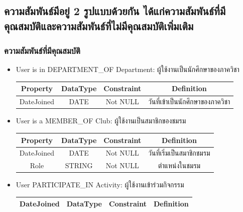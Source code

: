 \documentclass[14pt,oneside,openright,a4paper]{cpe-thai-project}
\begin{document}
    \subsection{ความสัมพันธ์มีอยู่ 2 รูปแบบด้วยกัน ได้แก่ความสัมพันธ์ที่มีคุณสมบัติและความสัมพันธ์ที่ไม่มีคุณสมบัติเพิ่มเติม}

    \subsubsection{ความสัมพันธ์ที่มีคุณสมบัติ}
    \begin{itemize}
      \normalsize
      \item User is in DEPARTMENT\_OF Department: ผู้ใช้งานเป็นนักศึกษาของภาควิชา
        \begin{center}
          \begin{tabular}{|c|c|c|c|}
          \hline
          \rowcolor[HTML]{9FC5E8} 
          Property   & DataType & Constraint & Definition \\ \hline
          DateJoined & DATE     & Not NULL    & วันที่เข้าเป็นนักศึกษาของภาควิชา \\ \hline
          \end{tabular}
          \label{tab:DepartmentRelationship}
        \end{center}
      \item User is a MEMBER\_OF Club: ผู้ใช้งานเป็นสมาชิกของชมรม
        \begin{center}
          \begin{tabular}{|c|c|c|c|}
          \hline
          \rowcolor[HTML]{9FC5E8} 
          Property   & DataType & Constraint & Definition \\ \hline
          DateJoined & DATE     & Not NULL    & วันที่เริ่มเป็นสมาชิกชมรม \\ \hline
          Role       & STRING   & Not NULL    & ตำแหน่งในชมรม \\ \hline
          \end{tabular}
          \label{tab:ClubRelationship}
        \end{center}
      \item User PARTICIPATE\_IN Activity: ผู้ใช้งานเข้าร่วมกิจกรรม
        \begin{center}
          \begin{tabular}{|c|c|c|c|}
          \hline
          \rowcolor[HTML]{9FC5E8} 
          DateJoined & DataType & Constraint & Definition \\ \hline

\end{tabular}
\end{center}
\end{itemize}
\end{document}
